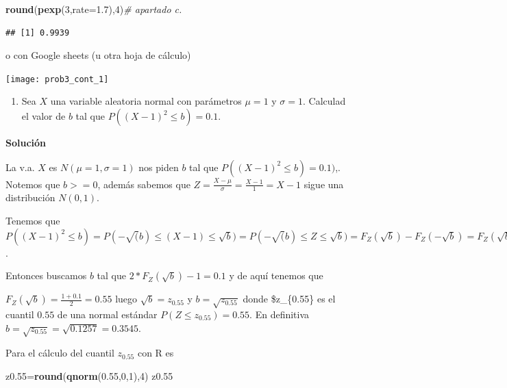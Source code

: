 \documentclass[
]{article}
\newenvironment{Shaded}{\begin{snugshade}}{\end{snugshade}}
\newcommand{\CommentTok}[1]{\textcolor[rgb]{0.56,0.35,0.01}{\textit{#1}}}
\newcommand{\DataTypeTok}[1]{\textcolor[rgb]{0.13,0.29,0.53}{#1}}
\newcommand{\DecValTok}[1]{\textcolor[rgb]{0.00,0.00,0.81}{#1}}
\newcommand{\FloatTok}[1]{\textcolor[rgb]{0.00,0.00,0.81}{#1}}
\newcommand{\KeywordTok}[1]{\textcolor[rgb]{0.13,0.29,0.53}{\textbf{#1}}}
\newcommand{\NormalTok}[1]{#1}
\providecommand{\tightlist}{%
  \setlength{\itemsep}{0pt}\setlength{\parskip}{0pt}}
\begin{document}
\begin{Shaded}
\begin{Highlighting}[]
\KeywordTok{round}\NormalTok{(}\KeywordTok{pexp}\NormalTok{(}\DecValTok{3}\NormalTok{,}\DataTypeTok{rate=}\FloatTok{1.7}\NormalTok{),}\DecValTok{4}\NormalTok{)}\CommentTok{\# apartado c.}
\end{Highlighting}
\end{Shaded}

\begin{verbatim}
## [1] 0.9939
\end{verbatim}

o con Google sheets (u otra hoja de cálculo)

\texttt{[image: prob3\_cont\_1]}

\newpage

\begin{enumerate}
\def\labelenumi{\arabic{enumi}.}
\setcounter{enumi}{3}
\tightlist
\item
  Sea \(X\) una variable aleatoria normal con parámetros \(\mu=1\) y
  \(\sigma=1\). Calculad el valor de \(b\) tal que
  \(P\left((X-1)^2\leq b\right)=0.1\).
\end{enumerate}

\textbf{Solución}

La v.a. \(X\) es \(N(\mu=1,\sigma=1)\) nos piden \(b\) tal que
\(P((X-1)^2\leq b)=0.1)\),. Notemos que \(b>=0\), además sabemos que
\(Z=\frac{X-\mu}{\sigma}=\frac{X-1}{1}=X-1\) sigue una distribución
\(N(0,1)\).

Tenemos que
\(P((X-1)^2\leq b)=P(-\sqrt(b)\leq (X-1)\leq\sqrt{b})=P(-\sqrt(b)\leq Z\leq \sqrt{b})=F_Z(\sqrt{b})-F_Z(-\sqrt{b})=F_Z(\sqrt{b})-(1-F_Z(\sqrt{b}))= 2*F_Z(\sqrt{b})-1\).

Entonces buscamos \(b\) tal que \(2*F_Z(\sqrt{b})-1=0.1\) y de aquí
tenemos que

\(F_Z(\sqrt{b})=\frac{1+0.1}{2}=0.55\) luego \(\sqrt{b}=z_{0.55}\) y
\(b=\sqrt{z_{0.55}}\) donde \$z\_\{0.55\} es el cuantil \(0.55\) de una
normal estándar \(P(Z\leq z_{0.55})=0.55.\) En definitiva
\(b=\sqrt{z_{0.55}}=\sqrt{0.1257}=0.3545.\)

Para el cálculo del cuantil \(z_{0.55}\) con R es

\begin{Shaded}
\begin{Highlighting}[]
\NormalTok{z0}\FloatTok{.55}\NormalTok{=}\KeywordTok{round}\NormalTok{(}\KeywordTok{qnorm}\NormalTok{(}\FloatTok{0.55}\NormalTok{,}\DecValTok{0}\NormalTok{,}\DecValTok{1}\NormalTok{),}\DecValTok{4}\NormalTok{)}
\NormalTok{z0}\FloatTok{.55}
\end{Highlighting}
\end{Shaded}
\end{document}
